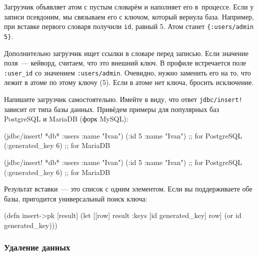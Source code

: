 \fi

Загрузчик объявляет атом с пустым словарём и наполняет его в~процессе. Если у
записи псевдоним, мы связываем его с ключом, который вернула база. Например, при
вставке первого словаря получили \verb|id|, равный 5. Атом станет
\verb|{:users/admin 5}|.

Дополнительно загрузчик ищет ссылки в словаре перед записью. Если значение
поля~--- кейворд, считаем, что это внешний ключ. В профиле встречается поле
\verb|:user_id| со значением \verb|:users/admin|. Очевидно, нужно заменить
его на то, что лежит в атоме по этому ключу (5). Если в атоме нет ключа,
бросить исключение.


Напишите загрузчик самостоятельно. Имейте в виду, что ответ
\verb|jdbc/insert!| зависит от типа базы данных. Привёдем примеры для
популярных баз PostgreSQL и MariaDB (форк MySQL):

\ifx\devicetype\mobile

\begin{english}
  \begin{clojure}
(jdbc/insert! *db*
  :users {:name "Ivan"})
({:id 5 :name "Ivan"}) ;; for PostgreSQL
({:generated_key 6})   ;; for MariaDB
  \end{clojure}
\end{english}

\else

\begin{english}
  \begin{clojure}
(jdbc/insert! *db* :users {:name "Ivan"})
({:id 5 :name "Ivan"}) ;; for PostgreSQL
({:generated_key 6})   ;; for MariaDB
  \end{clojure}
\end{english}

\fi

Результат вставки~--- это список с одним элементом. Если вы поддерживаете обе базы,
пригодится универсальный поиск ключа:

\begin{english}
  \begin{clojure}
(defn insert->pk [result]
  (let [[row] result
        {:keys [id generated_key]} row]
    (or id generated_key)))
  \end{clojure}
\end{english}

\subsubsection*{Удаление данных}

